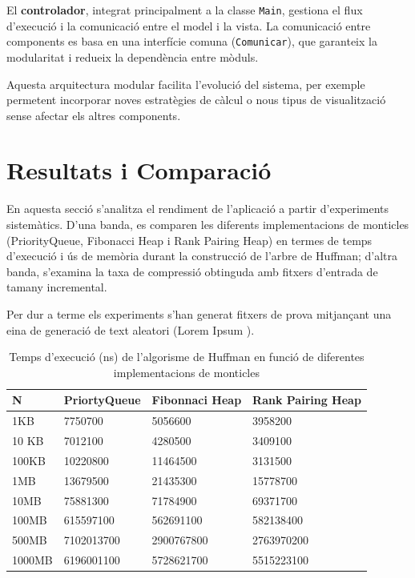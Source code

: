 \documentclass{ieeetj}
\begin{document}
El \textbf{controlador}, integrat principalment a la classe \texttt{Main}, gestiona el flux d’execució i la comunicació entre el model i la vista. La comunicació entre components es basa en una interfície comuna (\texttt{Comunicar}), que garanteix la modularitat i redueix la dependència entre mòduls.

Aquesta arquitectura modular facilita l’evolució del sistema, per exemple permetent incorporar noves estratègies de càlcul o nous tipus de visualització sense afectar els altres components.



\section{Resultats i Comparació}
En aquesta secció s'analitza el rendiment de l'aplicació a partir d'experiments sistemàtics. D'una banda, es comparen les diferents implementacions de monticles (PriorityQueue, Fibonacci Heap i Rank Pairing Heap) en termes de temps d'execució i ús de memòria durant la construcció de l'arbre de Huffman; d'altra banda, s'examina la taxa de compressió obtinguda amb fitxers d'entrada de tamany incremental.\newline

Per dur a terme els experiments s'han generat fitxers de prova mitjançant una eina de generació de text aleatori (Lorem Ipsum \cite{LoremIpsum}).


\begin{table}[H]
    \centering
    \begin{tabular}{|l|l|l|l|}
        \hline
        \textbf {N} & \textbf{PriortyQueue} & \textbf{Fibonnaci Heap} & \textbf{Rank Pairing Heap} \\
        \hline
         1KB &	  7750700   &	 5056600  &   3958200 \\
        10 KB &	   7012100  &	  4280500  &   3409100 \\
        100KB &   10220800  &	 11464500  &   3131500 \\
        1MB	&     13679500  &    21435300  &   15778700 \\
        10MB &	  75881300  &	 71784900  &  69371700 \\
        100MB &	 615597100  &   562691100 &	 582138400 \\
        500MB & 7102013700  &  2900767800 &	2763970200\\
        1000MB&	6196001100	&  5728621700 &	5515223100\\
        \hline
    \end{tabular}
    \vspace{3mm}
    \caption{Temps d'execució (ns) de l'algorisme de Huffman en funció de diferentes implementacions de monticles}
    \label{tab:complexitat}
\end{table}
\end{document}

